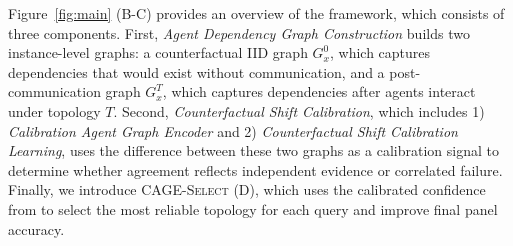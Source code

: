 Figure~\ref{fig:main} (B-C) provides an overview of the \methodname{} framework, which consists of three components. 
First, \textit{Agent Dependency Graph Construction} builds two instance-level graphs: a counterfactual IID graph \(G_x^0\), which captures dependencies that would exist without communication, and a post-communication graph \(G_x^T\), which captures dependencies after agents interact under topology \(T\). 
Second, \textit{Counterfactual Shift Calibration}, which includes  1) \textit{Calibration Agent Graph Encoder} and 2) \textit{Counterfactual Shift Calibration Learning}, uses the difference between these two graphs as a calibration signal to determine whether agreement reflects independent evidence or correlated failure. 
Finally, we introduce \textsc{CAGE-Select} (D), which uses the calibrated confidence from \methodname{} to select the most reliable topology for each query and improve final panel accuracy.














